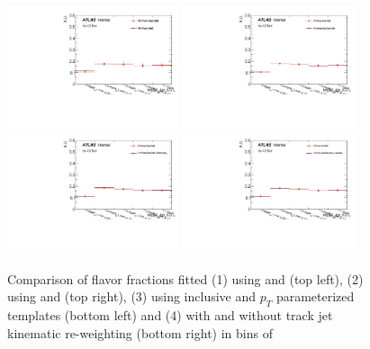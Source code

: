 \begin{figure}[htbp]
  \centering
 \includegraphics[width=0.45\textwidth]{figures/gbb/Sub_Sd0_Fits/Canv_fracmasspt_leadCrossCheck.pdf}
 \includegraphics[width=0.45\textwidth]{figures/gbb/Sub_Sd0_Fits/Canv_fracmasspt_subsubCrossCheck.pdf}\\
 \includegraphics[width=0.45\textwidth]{figures/gbb/Sub_Sd0_Fits/Canv_fracmasspt_ptbinCrossCheck.pdf}
 \includegraphics[width=0.45\textwidth]{figures/gbb/Sub_Sd0_Fits/Canv_fracmasspt_noreweightCrossCheck.pdf}\\
\caption{Comparison of flavor fractions fitted (1) using \subsdzero and \sdzero (top left), (2) using \subsdzero and \subsubsdzero (top right), (3) using inclusive and $p_T$ parameterized templates (bottom left) and (4) with and without track jet kinematic re-weighting (bottom right) in bins of \mpt}
  \label{fig:fracmasspt-fitfrac-crosscheck}
\end{figure}


